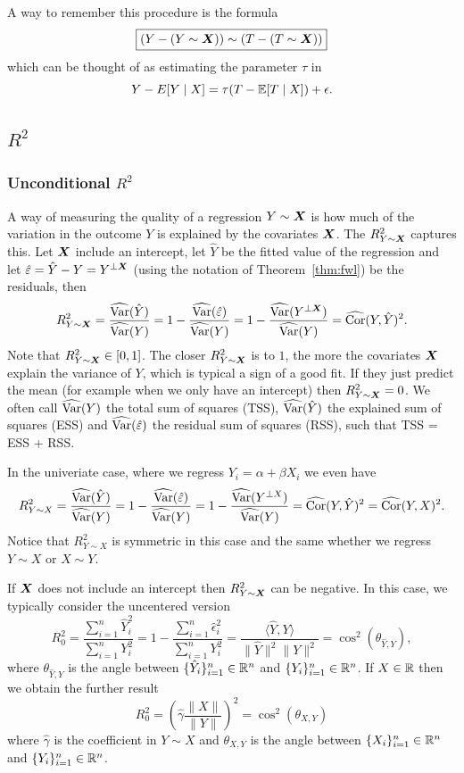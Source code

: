 \documentclass[11pt]{exam}
\begin{document}
\medskip
\noindent
A way to remember this procedure is the formula
\[
\boxed{
 (Y - (Y \sim \bm{X})) \sim (T - (T \sim \bm{X}))
}
\]
which can be thought of as estimating the parameter $\tau$ in
\[
    Y - E[Y \mid X] = \tau (T - \mathbb{E}[T \mid X]) + \epsilon.
\]

\subsection{$R^2$}\label{sec:r2}
\subsubsection{Unconditional $R^2$}
A way of measuring the quality of a regression $Y \sim \bm{X}$ is how much of the variation in the outcome $Y$ is explained by the covariates $\bm{X}$. The $R_{Y \sim \bm{X}}^2$ captures this. Let $\bm{X}$ include an intercept, let $\hat Y$ be the fitted value of the regression and let $\hat \varepsilon = \hat Y - Y =  Y^{\perp \bm{X}}$ (using the notation of Theorem~\ref{thm:fwl}) be the residuals, then
\[
    R_{Y \sim \bm{X}}^2 = \frac{\widehat{\mathrm{Var}}(\hat Y)}{\widehat{\mathrm{Var}}(Y)} = 1 - \frac{\widehat{\mathrm{Var}}(\hat \varepsilon)}{\widehat{\mathrm{Var}}(Y)} = 1 - \frac{\widehat{\mathrm{Var}}(Y^{\perp \bm{X}})}{\widehat{\mathrm{Var}}(Y)} = \widehat{\mathrm{Cor}}(Y, \hat Y)^2.
\]
Note that $R_{Y \sim \bm{X}}^2 \in [0, 1]$. The closer $R_{Y \sim \bm{X}}^2$ is to $1$, the more the covariates $\bm{X}$ explain the variance of $Y$, which is typical a sign of a good fit. If they just predict the mean (for example when we only have an intercept) then $R_{Y \sim \bm{X}}^2 = 0$.
We often call $\widehat{\mathrm{Var}}(Y)$ the total sum of squares (TSS), $\widehat{\mathrm{Var}}(\hat Y)$ the explained sum of squares (ESS) and $\widehat{\mathrm{Var}}(\hat \varepsilon)$ the residual sum of squares (RSS), such that TSS = ESS + RSS. 

In the univeriate case, where we regress $Y_i = \alpha + \beta X_i$ we even have
\[
    R_{Y \sim X}^2 = \frac{\widehat{\mathrm{Var}}(\hat Y)}{\widehat{\mathrm{Var}}(Y)} = 1 - \frac{\widehat{\mathrm{Var}}(\hat \varepsilon)}{\widehat{\mathrm{Var}}(Y)} = 1 - \frac{\widehat{\mathrm{Var}}(Y^{\perp X})}{\widehat{\mathrm{Var}}(Y)} = \widehat{\mathrm{Cor}}(Y, \hat Y)^2 =\widehat{\mathrm{Cor}}(Y, X)^2.
\]
Notice that $R_{Y \sim X}^2$ is symmetric in this case and the same whether we regress $Y \sim X$ or $X \sim Y$.

\begin{remark}
    If $\bm{X}$ does not include an intercept then $R_{Y \sim \bm{X}}^2$ can be negative. In this case, we typically consider the uncentered version
    \[
        R_0^2 = \frac{\sum_{i=1}^n \hat Y_i^2}{\sum_{i=1}^n Y_i^2} = 1 - \frac{\sum_{i=1}^n \hat \epsilon_i^2}{\sum_{i=1}^n Y_i^2} = \frac{\langle \hat Y,Y\rangle}{\|\hat Y \|^2 \|Y \|^2} = \cos^2{(\theta_{\hat Y, Y})},
    \]
    where $\theta_{\hat Y, Y}$ is the angle between $\{\hat Y_i\}_{i=1}^n \in \mathbb{R}^n$ and $\{Y_i\}_{i=1}^n \in \mathbb{R}^n$.
    If $X \in \mathbb{R}$ then we obtain the further result
    \[
        R_0^2 = \left(\hat \gamma \frac{\|X\|}{\|Y\|}\right)^2 = \cos^2{(\theta_{X, Y})}
    \]
     where $\hat \gamma$ is the coefficient in $Y \sim X$ and $\theta_{X, Y}$ is the angle between $\{X_i\}_{i=1}^n \in \mathbb{R}^n$ and $\{Y_i\}_{i=1}^n \in \mathbb{R}^n$.
\end{remark}
\end{document}
